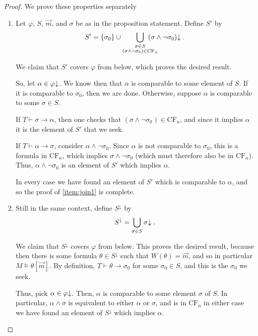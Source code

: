 \documentclass{article}
\theoremstyle{nonumberplain}
\newtheorem{proof}{Proof}
\newcommand{\CF}{\mathrm{CF}}
\newcommand{\dncl}[1]{{#1}\hspace{-0.25em}\downarrow}
\begin{document}
\begin{proof}
We prove these properties separately
\begin{enumerate}
\item Let $\varphi$, $S$, $\vec m$, and $\sigma$ be as in the proposition statement. Define $S'$ by
\begin{equation}
S' = \{\sigma_0\} \cup \bigcup_{\substack{\sigma \in S\\ (\sigma \land \neg \sigma_0) \in \CF_n}} \hspace{-1.6em} \dncl{(\sigma \land \neg \sigma_0)}.
\end{equation}

We claim that $S'$ covers $\varphi$ from below, which proves the desired result.

So, let $\alpha \in \dncl\varphi$. We know then that $\alpha$ is comparable to some element of $S$. If it is comparable to $\sigma_0$, then we are done. Otherwise, suppose $\alpha$ is comparable to some $\sigma \in S$.

If $T \vdash \sigma \rightarrow \alpha$, then one checks that $(\sigma \land \neg\sigma_0) \in \CF_n$, and since it implies $\alpha$ it is the element of $S'$ that we seek.

If $T \vdash \alpha \rightarrow \sigma$, consider $\alpha \land \neg\sigma_0$. Since $\alpha$ is not comparable to $\sigma_0$, this is a formula in $\CF_n$, which implies $\sigma \land \neg \sigma_0$ (which must therefore also be in $\CF_n$). Thus, $\alpha \land \neg \sigma_0$ is an element of $S'$ which implies $\alpha$.

In every case we have found an element of $S'$ which is comparable to $\alpha$, and so the proof of \ref{item:join1} is complete.

\item Still in the same context, define $S^\downarrow$ by
\begin{equation}
S^\downarrow = \bigcup_{\sigma \in S} \dncl \sigma.
\end{equation}

We claim that $S^\downarrow$ covers $\varphi$ from below. This proves the desired result, because then there is some formula $\theta \in S^\downarrow$ such that $W(\theta) = \vec m$, and so in particular $M \vDash \theta[\vec m]$. By definition, $T \vdash \theta \rightarrow \sigma_0$ for some $\sigma_0 \in S$, and this is the $\sigma_0$ we seek.

Thus, pick $\alpha \in \dncl \varphi$. Then, $\alpha$ is comparable to some element $\sigma$ of $S$. In particular, $\alpha \land \sigma$ is equivalent to either $\alpha$ or $\sigma$, and is in $\CF_n$ in either case we have found an element of $S^\downarrow$ which implies $\alpha$.
\end{enumerate}
\end{proof}
\end{document}
